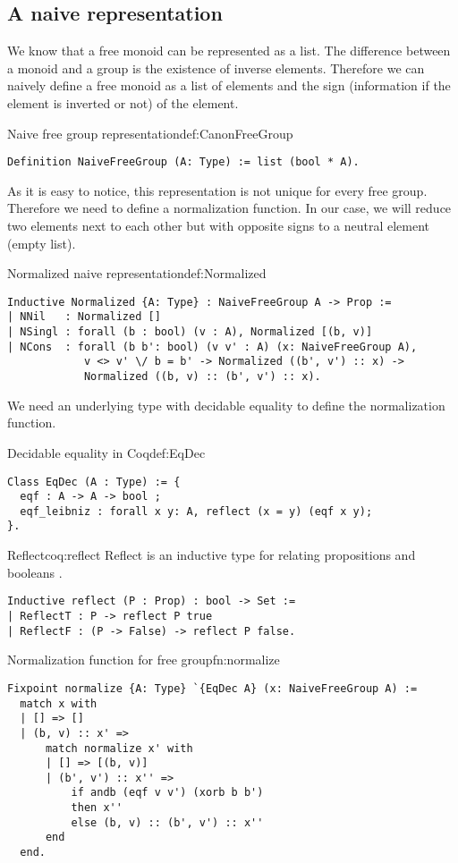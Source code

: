 \subsection{A naive representation}
We know that a free monoid can be represented as a list. The difference between a monoid and a group is the existence of inverse elements. Therefore we can naively define a free monoid as a list of elements and the sign (information if the element is inverted or not) of the element.
\begin{defi}{Naive free group representation}{def:CanonFreeGroup}
\begin{verbatim}
Definition NaiveFreeGroup (A: Type) := list (bool * A).
\end{verbatim}
\end{defi}
As it is easy to notice, this representation is not unique for every free group. Therefore we need to define a normalization function. In our case, we will reduce two elements next to each other but with opposite signs to a neutral element (empty list).
\begin{defi}{Normalized naive representation}{def:Normalized}
\begin{verbatim}
Inductive Normalized {A: Type} : NaiveFreeGroup A -> Prop :=
| NNil   : Normalized []
| NSingl : forall (b : bool) (v : A), Normalized [(b, v)]
| NCons  : forall (b b': bool) (v v' : A) (x: NaiveFreeGroup A), 
            v <> v' \/ b = b' -> Normalized ((b', v') :: x) ->
            Normalized ((b, v) :: (b', v') :: x).
\end{verbatim}
\end{defi}
We need an underlying type with decidable equality to define the normalization function.
\begin{defi}{Decidable equality in Coq}{def:EqDec}
\begin{verbatim}
Class EqDec (A : Type) := { 
  eqf : A -> A -> bool ;
  eqf_leibniz : forall x y: A, reflect (x = y) (eqf x y);
}.
\end{verbatim}
\end{defi}
\begin{coq}{Reflect}{coq:reflect}
Reflect is an inductive type for
relating propositions and booleans \cite{coqDoc}.
\begin{verbatim}
Inductive reflect (P : Prop) : bool -> Set :=
| ReflectT : P -> reflect P true
| ReflectF : (P -> False) -> reflect P false.
\end{verbatim}
\end{coq}
\begin{func}{Normalization function for free group}{fn:normalize}
\begin{verbatim}
Fixpoint normalize {A: Type} `{EqDec A} (x: NaiveFreeGroup A) :=
  match x with
  | [] => []
  | (b, v) :: x' => 
      match normalize x' with
      | [] => [(b, v)]
      | (b', v') :: x'' => 
          if andb (eqf v v') (xorb b b')
          then x''
          else (b, v) :: (b', v') :: x''
      end
  end.
\end{verbatim}
\end{func}
